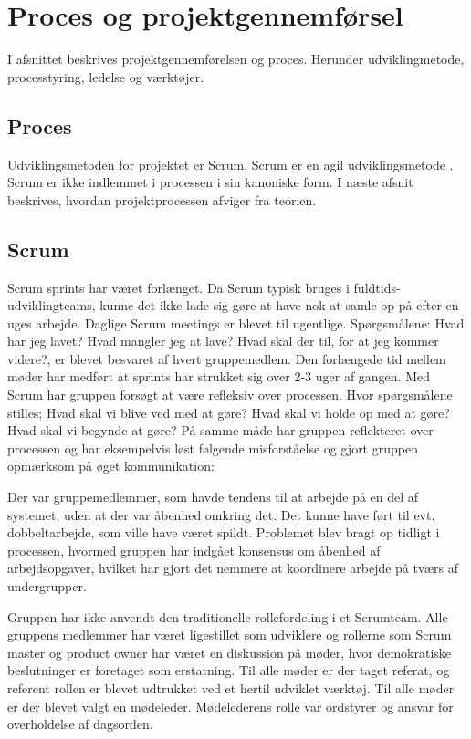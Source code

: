 \chapter{Proces og projektgennemførsel}

I afsnittet beskrives projektgennemførelsen og proces. Herunder udviklingmetode, processtyring, ledelse og værktøjer.

\section{Proces}
Udviklingsmetoden for projektet er Scrum. Scrum er en agil udviklingsmetode \cite[kap. 1]{robertmartin2006}. Scrum er ikke indlemmet i processen i sin kanoniske form. I næste afsnit beskrives, hvordan projektprocessen afviger fra teorien.

\section{Scrum}
Scrum sprints har været forlænget. Da Scrum typisk bruges i fuldtids-udviklingteams, kunne det ikke lade sig gøre at have nok at samle op på efter en uges arbejde. Daglige Scrum meetings er blevet til ugentlige. Spørgsmålene: Hvad har jeg lavet? Hvad mangler jeg at lave? Hvad skal der til, for at jeg kommer videre?, er blevet besvaret af hvert gruppemedlem. Den forlængede tid mellem møder har medført at sprints har strukket sig over 2-3 uger af gangen. Med Scrum har gruppen forsøgt at være refleksiv over processen. Hvor spørgsmålene stilles; Hvad skal vi blive ved med at gøre? Hvad skal vi holde op med at gøre? Hvad skal vi begynde at gøre? På samme måde har gruppen reflekteret over processen og har eksempelvis løst følgende misforståelse og gjort gruppen opmærksom på øget kommunikation:

Der var gruppemedlemmer, som havde tendens til at arbejde på en del af systemet, uden at der var åbenhed omkring det. Det kunne have ført til evt. dobbeltarbejde, som ville have været spildt. Problemet blev bragt op tidligt i processen, hvormed gruppen har indgået konsensus om åbenhed af arbejdsopgaver, hvilket har gjort det nemmere at koordinere arbejde på tværs af undergrupper.

Gruppen har ikke anvendt den traditionelle rollefordeling i et Scrumteam. Alle gruppens medlemmer har været ligestillet som udviklere og rollerne som Scrum master og product owner har været en diskussion på møder, hvor demokratiske beslutninger er foretaget som erstatning. Til alle møder er der taget referat, og referent rollen er blevet udtrukket ved et hertil udviklet værktøj. Til alle møder er der blevet valgt en mødeleder. Mødelederens rolle var ordstyrer og ansvar for overholdelse af dagsorden.

